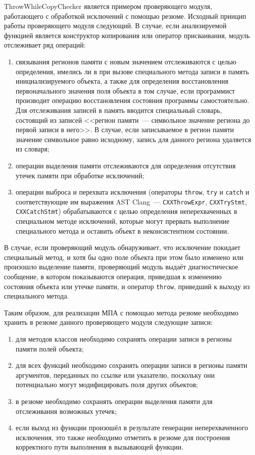 ThrowWhileCopyChecker является примером проверяющего модуля, работающего с обработкой исключений с помощью резюме. Исходный принцип работы проверяющего модуля следующий. В случае, если анализируемой функцией является конструктор копирования или оператор присваивания, модуль отслеживает ряд операций: 
\begin{enumerate}
 \item связывания регионов памяти с новым значением отслеживаются с целью определения, имелись ли в при вызове специального метода записи в память инициализируемого объекта, а также для определения восстановления первоначального значения поля объекта в том случае, если программист производит операцию восстановления состояния программы самостоятельно. Для отслеживания записей в память вводится специальный словарь, состоящий из записей <<регион памяти~--- символьное значение региона до первой записи в него>>. В случае, если записываемое в регион памяти значение символьное равно исходному, запись для данного региона удаляется из словаря;
 \item операции выделения памяти отслеживаются для определения отсутствия утечек памяти при обработке исключений;
 \item операции выброса и перехвата исключения (операторы \texttt{throw}, \texttt{try} и \texttt{catch} и соответствующие им выражения AST Clang~--- \texttt{CXXThrowExpr}, \texttt{CXXTryStmt}, \texttt{CXXCatchStmt}) обрабатываются с целью определения неперехваченных в специальном методе исключений, которые могут прервать выполнение специального метода и оставить объект в неконсистентном состоянии.
\end{enumerate}

В случае, если проверяющий модуль обнаруживает, что исключение покидает специальный метод, и хотя бы одно поле объекта при этом было изменено или произошло выделение памяти, проверяющий модуль выдаёт диагностическое сообщение, в котором показываются операция, приведшая к изменению состояния объекта или утечке памяти, и оператор \texttt{throw}, приведший к выходу из специального метода.

Таким образом, для реализации МПА с помощью метода резюме необходимо хранить в резюме данного проверяющего модуля следующие записи:

\begin{enumerate}
 \item для методов классов необходимо сохранять операции записи в регионы памяти полей объекта;
 \item для всех функций необходимо сохранять операции записи в регионы памяти аргументов, переданных по ссылке или указателю, поскольку они потенциально могут модифицировать поля других объектов;
 \item в резюме необходимо сохранять операции выделения памяти для отслеживания возможных утечек;
 \item если выход из функции произошёл в результате генерации неперехваченного исключения, это также необходимо отметить в резюме для построения корректного пути выполнения в вызывающей функции.
\end{enumerate}

